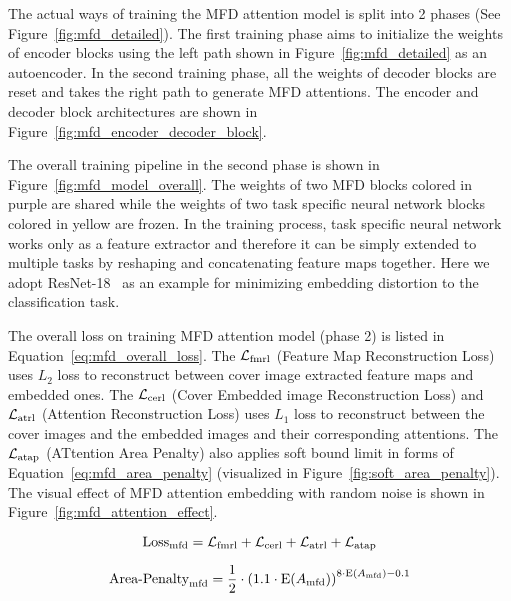 
\figureMFDModelOverall%
 
\figureMfdEncoderDecoderBlock%

The actual ways of training the MFD attention model is split into 2 phases (See Figure~\ref{fig:mfd_detailed}). The first training phase aims to initialize the weights of encoder blocks using the left path shown in Figure~\ref{fig:mfd_detailed} as an autoencoder. In the second training phase, all the weights of decoder blocks are reset and takes the right path to generate MFD attentions. The encoder and decoder block architectures are shown in Figure~\ref{fig:mfd_encoder_decoder_block}.

The overall training pipeline in the second phase is shown in Figure~\ref{fig:mfd_model_overall}. The weights of two MFD blocks colored in purple are shared while the weights of two task specific neural network blocks colored in yellow are frozen. In the training process, task specific neural network works only as a feature extractor and therefore it can be simply extended to multiple tasks by reshaping and concatenating feature maps together. Here we adopt ResNet-18~\cite{ResNet} as an example for minimizing embedding distortion to the classification task.

The overall loss on training MFD attention model (phase 2) is listed in Equation~\ref{eq:mfd_overall_loss}.
The \( \mathcal{L}_\mathrm{fmrl} \) (Feature Map Reconstruction Loss) uses \(L_2\) loss to reconstruct between cover image extracted feature maps and embedded ones. The \( \mathcal{L}_\mathrm{cerl} \) (Cover Embedded image Reconstruction Loss) and \( \mathcal{L}_\mathrm{atrl} \) (Attention Reconstruction Loss) uses \(L_1\) loss to reconstruct between the cover images and the embedded images and their corresponding attentions. The \( \mathcal{L}_\mathrm{atap} \) (ATtention Area Penalty) also applies soft bound limit in forms of Equation~\ref{eq:mfd_area_penalty} (visualized in Figure~\ref{fig:soft_area_penalty}). The visual effect of MFD attention embedding with random noise is shown in Figure~\ref{fig:mfd_attention_effect}.

\begin{equation}
  \mathrm{Loss}_{\text{mfd}} = \mathcal{L}_\mathrm{fmrl} + \mathcal{L}_\mathrm{cerl} + \mathcal{L}_\mathrm{atrl} + \mathcal{L}_\mathrm{atap}
  \label{eq:mfd_overall_loss}
\end{equation}

\begin{equation}
  \text{Area-Penalty}_{\text{mfd}} = \frac{1}{2} \cdot {(1.1 \cdot \mathrm{E}(A_{\text{mfd}}))}^{8 \cdot \mathrm{E}(A_{\text{mfd}}) - 0.1}
  \label{eq:mfd_area_penalty}
\end{equation}

\figureSoftAreaPenalty%

\figureMfdAttentionEffect%
